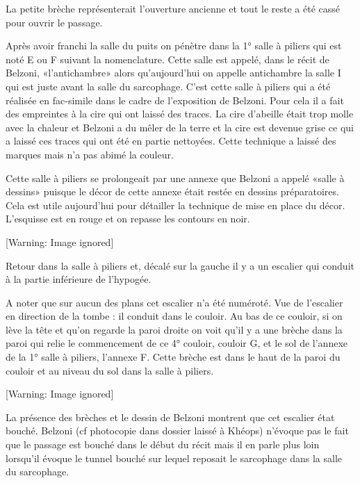 \documentclass{article}
\begin{document}
La petite brèche représenterait l’ouverture ancienne et tout le reste a
été cassé pour ouvrir le passage.

Après avoir franchi la salle du puits on pénètre dans la 1° salle à
piliers qui est noté E ou F suivant la nomenclature. Cette salle est
appelé, dans le récit de Belzoni, «l’antichambre» alors qu’aujourd’hui
on appelle antichambre la salle I qui est juste avant la salle du
sarcophage. C’est cette salle à piliers qui a été réalisée en
fac-simile dans le cadre de l’exposition de Belzoni. Pour cela il a
fait des empreintes à la cire qui ont laissé des traces.  La cire
d’abeille était trop molle avec la chaleur et Belzoni a du mêler de la
terre et la cire est devenue grise ce qui a laissé ces traces qui ont
été en partie nettoyées. Cette technique a laissé des marques mais n’a
pas abimé la couleur.

Cette salle à piliers se prolongeait par une annexe que Belzoni a appelé
«salle à dessins» puisque le décor de cette annexe était restée en
dessins préparatoires. Cela est utile aujourd’hui pour détailler la
technique de mise en place du décor. L’esquisse est en rouge et on
repasse les contours en noir.

  [Warning: Image ignored] %
 

Retour dans la salle à piliers et, décalé sur la gauche il y a un
escalier qui conduit à la partie inférieure de l’hypogée.

A noter que sur aucun des plans cet escalier n’a été numéroté. Vue de
l’escalier en direction de la tombe : il conduit dans le couloir. Au
bas de ce couloir, si on lève la tête et qu’on regarde la paroi droite
on voit qu’il y a une brèche dans la paroi qui relie le commencement de
ce 4° couloir, couloir G, et le sol de l’annexe de la 1° salle à
piliers, l’annexe F.  Cette brèche est dans le haut de la paroi du
couloir et au niveau du sol dans la salle à piliers. 

  [Warning: Image ignored] %
 

La présence des brèches et le dessin de Belzoni montrent que cet
escalier état bouché. Belzoni (cf photocopie dans dossier laissé à
Khéops) n’évoque pas le fait que le passage est bouché dans le début du
récit mais il en parle plus loin lorsqu’il évoque le tunnel bouché  sur
lequel reposait le sarcophage dans la salle du sarcophage. 
\end{document}
